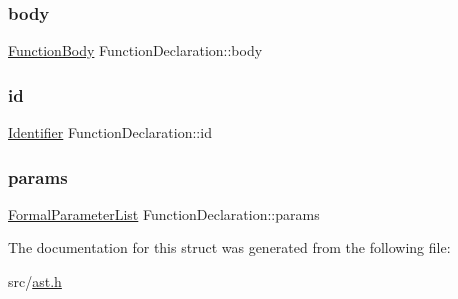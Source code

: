 \subsubsection{\texorpdfstring{body}{body}}
{\footnotesize\ttfamily \hyperlink{struct_function_body}{Function\+Body} Function\+Declaration\+::body}

\mbox{\label{struct_function_declaration_a870d4699e91dd3157a5de4162ceb485b}} 
\subsubsection{\texorpdfstring{id}{id}}
{\footnotesize\ttfamily \hyperlink{struct_identifier}{Identifier} Function\+Declaration\+::id}

\mbox{\label{struct_function_declaration_a4de4e4084ad0e0cd285e0279759aca10}} 
\subsubsection{\texorpdfstring{params}{params}}
{\footnotesize\ttfamily \hyperlink{ast_8h_ad423d9c7b02512f74f787f74587e9e76}{Formal\+Parameter\+List} Function\+Declaration\+::params}



The documentation for this struct was generated from the following file\+:\begin{DoxyCompactItemize}
\item 
src/\hyperlink{ast_8h}{ast.\+h}\end{DoxyCompactItemize}
